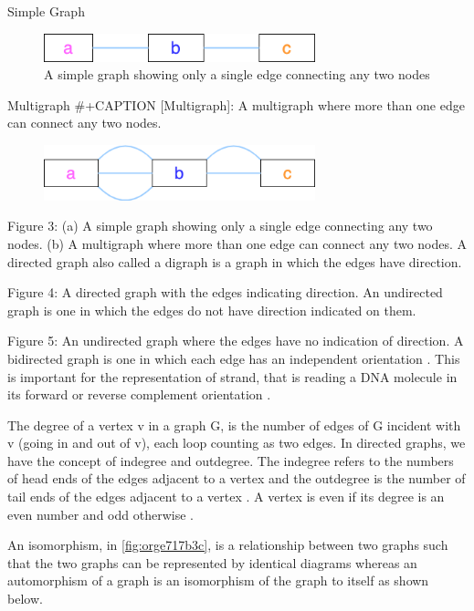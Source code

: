 \documentclass[10pt, a4paper]{article}
\begin{document}
Simple Graph
\begin{figure}
\centering
\includegraphics[width=0.7\textwidth]{figures/Graph-classifications-Simple-Graph.png}
\caption[Simple Graph]{\label{fig:orge789c54}A simple graph showing only a single edge connecting any two nodes}
\end{figure}


Multigraph
\#+CAPTION [Multigraph]: A multigraph where more than one edge can connect any two nodes.
\begin{figure}
\centering
\includegraphics[width=0.7\textwidth]{figures/Graph-classifications-Multigraph.png}
\label{org538d336}
\end{figure}


Figure 3: (a) A simple graph showing only a single edge connecting any two
nodes. (b) A multigraph where more than one edge can connect any two nodes.
A directed graph also called a digraph is a graph in which the edges have
direction.

Figure 4: A directed graph with the edges indicating direction.
An undirected graph is one in which the edges do not have direction indicated on
them.

Figure 5: An undirected graph where the edges have no indication of direction.
A bidirected graph is one in which each edge has an independent orientation
\cite{edmondsMatchingWellSolvedClass2003}.
This is important for the representation of strand, that is reading a DNA
molecule in its forward or reverse complement orientation 
\cite{patenGenomeGraphsEvolution2017}.

The degree of a vertex v in a graph G, is the number of edges of G incident with
v (going in and out of v), each loop counting as two edges. In directed graphs,
we have the concept of indegree and outdegree. The indegree refers to the
numbers of head ends of the edges adjacent to a vertex and the outdegree is the
number of tail ends of the edges adjacent to a vertex \cite{bondyGraphTheory2011}.
A vertex is even if its degree is an even number and odd otherwise
\cite{trudeauIntroductionGraphTheory1993}.

An isomorphism, in \ref{fig:orge717b3c}, is a relationship between two graphs such that the two graphs
can be represented by identical diagrams \cite{bondyGraphTheory2011} whereas an 
automorphism of a graph is an isomorphism of the graph to itself as shown below.
\end{document}
